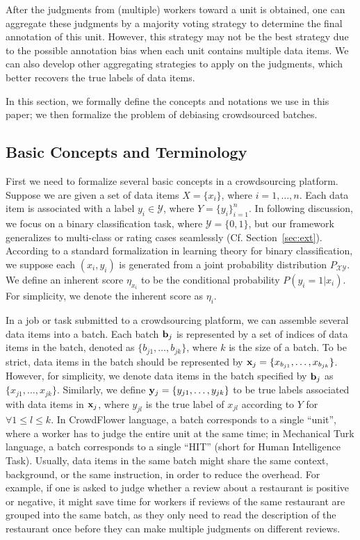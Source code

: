 {After the judgments from (multiple) workers toward a unit is obtained,
one can aggregate these judgments by a majority voting strategy to determine the final annotation of this unit.
However, this strategy may not be the best strategy due to the possible annotation bias when each unit contains multiple data items.
We can also develop other aggregating strategies to apply on the judgments,
which better recovers the true labels of data items.
}

%

In this section, we formally define the concepts and notations we use in this paper;
we then formalize the problem of debiasing crowdsourced batches.


\subsection{Basic Concepts and Terminology}

First we need to formalize several basic concepts in a crowdsourcing platform.
Suppose we are given a set of data items $X = \{x_i\}$, where $i=1, \ldots, n$.
Each data item is associated with a label $y_i \in \mathcal{Y}$, where $Y = \{y_i\}_{i=1}^n$.
In following discussion, we focus on a binary classification task, 
where $\mathcal{Y} = \{0, 1\}$, 
but our framework generalizes to multi-class or rating cases seamlessly (Cf. Section~\ref{sec:ext}).  
According to a standard formalization in learning theory for binary classification, 
we suppose each $(x_i, y_i)$ is generated from a joint probability distribution $P_{\mathcal{X} \mathcal{Y}}$.
We define an inherent score $\eta_{x_i}$ to be the conditional probability $P(y_i = 1 | x_i)$.  
For simplicity, we denote the inherent score as $\eta_i$.  

In a job or task submitted to a crowdsourcing platform,
we can assemble several data items into a batch. %
Each batch ${\mathbf{b}}_j$ is represented by a set of indices of data items in the batch,
denoted as $\{b_{j1}, \ldots, b_{jk}\}$, 
where $k$ is the size of a batch. 
To be strict, data items in the batch should be represented by ${\mathbf{x}}_j = \{x_{b_{j1}}, \ldots, x_{b_{jk}}\}$.  
However, for simplicity, we denote data items in the batch specified by ${\mathbf{b}}_j$ as $\{x_{j1}, \ldots, x_{jk}\}$.  
Similarly, we define ${\mathbf{y}}_j = \{y_{j1}, \ldots, y_{jk}\}$ to be true labels associated with data items in ${\mathbf{x}}_j$, 
where $y_{jl}$ is the true label of $x_{jl}$ according to $Y$ for $\forall 1 \leq l \leq k$.  
In CrowdFlower language, 
a batch corresponds to a single ``unit'', 
where a worker has to judge the entire unit at the same time;
in Mechanical Turk language,
a batch corresponds to a single ``HIT'' (short for Human Intelligence Task).
Usually, data items in the same batch might share the same context, background, or the same instruction, 
in order to reduce the overhead.  
For example, if one is asked to judge whether 
a review about a restaurant is positive or negative, 
it might save time for workers if 
reviews of the same restaurant are grouped into the same batch, 
as they only need to read the description of the restaurant once 
before they can make multiple judgments on different reviews.  


